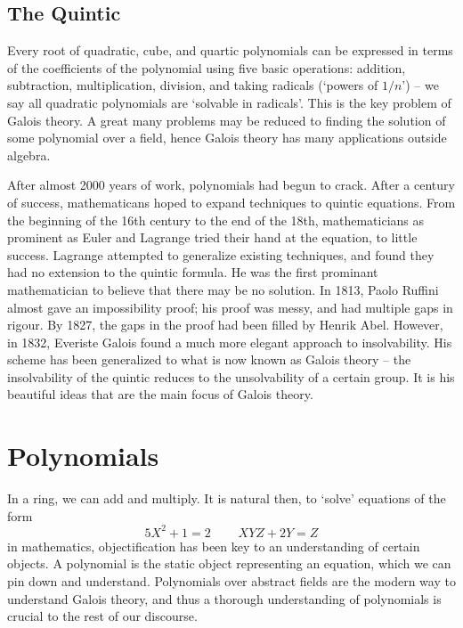 \section{The Quintic}

Every root of quadratic, cube, and quartic polynomials can be expressed in terms of the coefficients of the polynomial using five basic operations: addition, subtraction, multiplication, division, and taking radicals (`powers of $1/n$') -- we say all quadratic polynomials are `solvable in radicals'. This is the key problem of Galois theory. A great many problems may be reduced to finding the solution of some polynomial over a field, hence Galois theory has many applications outside algebra.

After almost 2000 years of work, polynomials had begun to crack. After a century of success, mathematicans hoped to expand techniques to quintic equations. From the beginning of the 16th century to the end of the 18th, mathematicians as prominent as Euler and Lagrange tried their hand at the equation, to little success. Lagrange attempted to generalize existing techniques, and found they had no extension to the quintic formula. He was the first prominant mathematician to believe that there may be no solution. In 1813, Paolo Ruffini almost gave an impossibility proof; his proof was messy, and had multiple gaps in rigour. By 1827, the gaps in the proof had been filled by Henrik Abel. However, in 1832, Everiste Galois found a much more elegant approach to insolvability. His scheme has been generalized to what is now known as Galois theory -- the insolvability of the quintic reduces to the unsolvability of a certain group. It is his beautiful ideas that are the main focus of Galois theory.









\chapter{Polynomials}

In a ring, we can add and multiply. It is natural then, to `solve' equations of the form
%
\[ 5 X^2 + 1 = 2\ \ \ \ \ \ \ \ \ \ XYZ + 2Y = Z \]
%
in mathematics, objectification has been key to an understanding of certain objects. A polynomial is the static object representing an equation, which we can pin down and understand. Polynomials over abstract fields are the modern way to understand Galois theory, and thus a thorough understanding of polynomials is crucial to the rest of our discourse.

